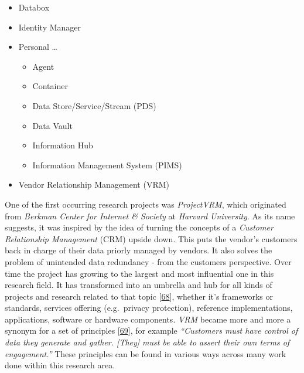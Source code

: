 \documentclass[12pt,english,a4paper,titlepage,cleardoublepage=empty,dottedtoc]{report}
\providecommand{\tightlist}{%
  \setlength{\itemsep}{0pt}\setlength{\parskip}{0pt}}
\begin{document}
\begin{itemize}
\tightlist
\item
  Databox
\item
  Identity Manager
\item
  Personal \ldots{}

  \begin{itemize}
  \tightlist
  \item
    Agent
  \item
    Container
  \item
    Data Store/Service/Stream (PDS)
  \item
    Data Vault
  \item
    Information Hub
  \item
    Information Management System (PIMS)
  \end{itemize}
\item
  Vendor Relationship Management (VRM)
\end{itemize}

One of the first occurring research projects was \emph{ProjectVRM},
which originated from \emph{Berkman Center for Internet \& Society} at
\emph{Harvard University}. As its name suggests, it was inspired by the
idea of turning the concepts of a \emph{Customer Relationship
Management} (CRM) upside down. This puts the vendor's customers back in
charge of their data priorly managed by vendors. It also solves the
problem of unintended data redundancy - from the customers perspective.
Over time the project has growing to the largest and most influential
one in this research field. It has transformed into an umbrella and hub
for all kinds of projects and research related to that topic
{[}\protect\hyperlink{ref-web_2016_projectvrm_development-work}{68}{]},
whether it's frameworks or standards, services offering (e.g.~privacy
protection), reference implementations, applications, software or
hardware components. \emph{VRM} became more and more a synonym for a set
of principles
{[}\protect\hyperlink{ref-web_2016_projectvrm_principles}{69}{]}, for
example \emph{``Customers must have control of data they generate and
gather. {[}They{]} must be able to assert their own terms of
engagement.''} These principles can be found in various ways across many
work done within this research area.
\end{document}
